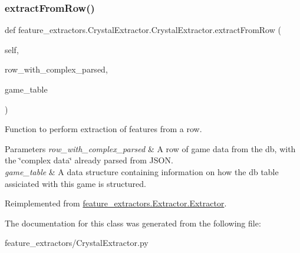 \subsubsection{\texorpdfstring{extractFromRow()}{extractFromRow()}}
{\footnotesize\ttfamily def feature\+\_\+extractors.\+Crystal\+Extractor.\+Crystal\+Extractor.\+extract\+From\+Row (\begin{DoxyParamCaption}\item[{}]{self,  }\item[{}]{row\+\_\+with\+\_\+complex\+\_\+parsed,  }\item[{\mbox{\hyperlink{class_game_table_1_1_game_table}{Game\+Table}}}]{game\+\_\+table }\end{DoxyParamCaption})}



Function to perform extraction of features from a row. 


\begin{DoxyParams}{Parameters}
{\em row\+\_\+with\+\_\+complex\+\_\+parsed} & A row of game data from the db, with the \char`\"{}complex data\char`\"{} already parsed from J\+S\+ON. \\
\hline
{\em game\+\_\+table} & A data structure containing information on how the db table assiciated with this game is structured. \\
\hline
\end{DoxyParams}


Reimplemented from \mbox{\hyperlink{classfeature__extractors_1_1_extractor_1_1_extractor_a98fc31f77b3c7650f49480097f1f6da4}{feature\+\_\+extractors.\+Extractor.\+Extractor}}.



The documentation for this class was generated from the following file\+:\begin{DoxyCompactItemize}
\item 
feature\+\_\+extractors/Crystal\+Extractor.\+py\end{DoxyCompactItemize}

